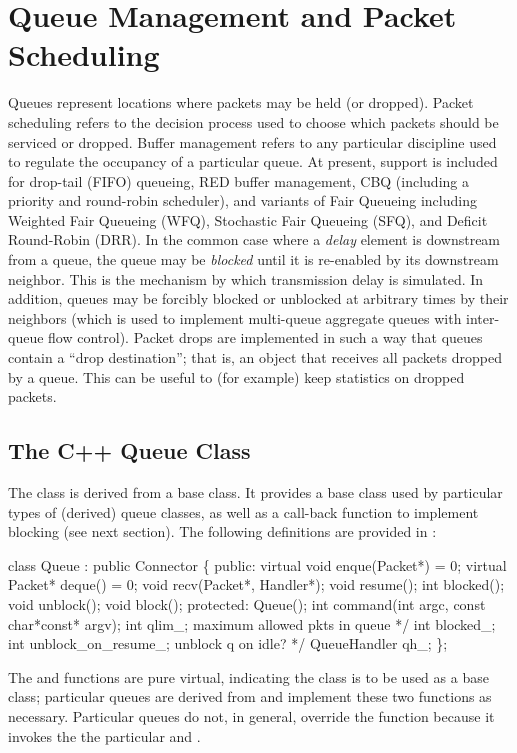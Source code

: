 %
%
\chapter{Queue Management and Packet Scheduling}
\label{chap:qmgmt}

Queues represent locations where packets may be held (or dropped).
Packet scheduling refers to the decision process used to choose
which packets should be serviced or dropped.
Buffer management refers to any particular discipline used
to regulate the occupancy of a particular queue.
At present, support is included for drop-tail (FIFO) queueing,
RED buffer management, CBQ (including a priority and round-robin scheduler), and
variants of Fair Queueing including Weighted Fair Queueing (WFQ), 
Stochastic Fair Queueing (SFQ), and Deficit Round-Robin (DRR).
In the common case where a {\em delay} element is downstream from
a queue, the queue may be {\em blocked} until it is re-enabled
by its downstream neighbor.
This is the mechanism by which transmission delay is simulated.
In addition, queues may be forcibly blocked or unblocked at arbitrary
times by their neighbors (which is used to implement multi-queue
aggregate queues with inter-queue flow control).
Packet drops are implemented in such a way that queues contain
a ``drop destination''; that is, an object that receives all packets
dropped by a queue.
This can be useful to (for example) keep statistics on dropped packets.

\section{The C++ Queue Class}
\label{sec:qclass}

The  class is derived from a  base class.
It provides a base class used by particular types of (derived) queue classes,
as well as a call-back function to implement blocking (see next section).
The following definitions are provided in :
\begin{program}
        class Queue : public Connector \{
         public:
                virtual void enque(Packet*) = 0;
                virtual Packet* deque() = 0;
                void recv(Packet*, Handler*);
                void resume();
                int blocked();
                void unblock();
                void block();
         protected:
                Queue();
                int command(int argc, const char*const* argv);
                int qlim_;         \* maximum allowed pkts in queue */
                int blocked_;
                int unblock_on_resume_; \* unblock q on idle? */
                QueueHandler qh_;
        \};
\end{program}
The  and  functions are pure virtual, indicating
the  class is to be used as a base class;
particular queues are derived
from  and implement these two functions as necessary.
Particular queues do not, in general, override the  function
because it invokes the
the particular  and .

